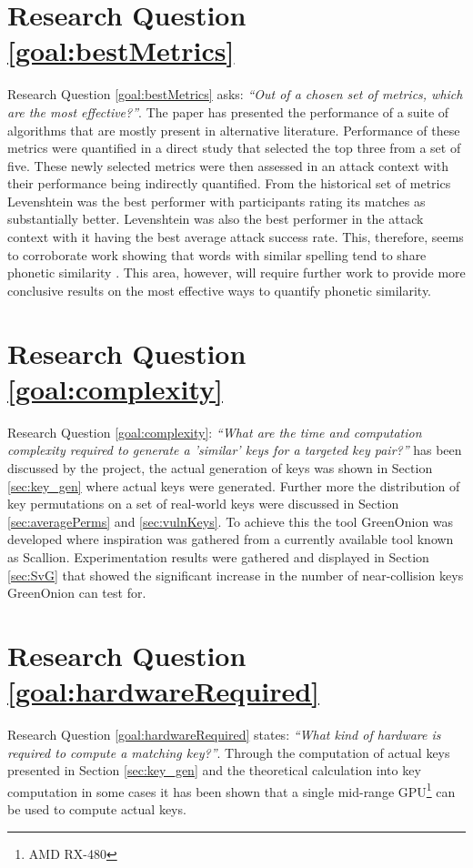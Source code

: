 \section{Research Question \ref{goal:bestMetrics}}
Research Question \ref{goal:bestMetrics} asks: \textit{``Out of a chosen set of metrics, which are the most effective?''}. 
The paper has presented the performance of a suite of algorithms that are mostly present in alternative literature. Performance of these metrics were quantified in a direct study that selected the top three from a set of five. These newly selected metrics were then assessed in an attack context with their performance being indirectly quantified. From the historical set of metrics Levenshtein was the best performer with participants rating its matches as substantially better. Levenshtein was also the best performer in the attack context with it having the best average attack success rate. This, therefore, seems to corroborate work showing that words with similar spelling tend to share phonetic similarity \cite{hettiarachchi2012sparcl}. This area, however, will require further work to provide more conclusive results on the most effective ways to quantify phonetic similarity.

\section{Research Question \ref{goal:complexity}}
Research Question \ref{goal:complexity}: \textit{``What are the time and computation complexity required to generate a ’similar’ keys for a targeted key pair?''} has been discussed by the project, the actual generation of keys was shown in Section \ref{sec:key_gen} where actual keys were generated. Further more the distribution of key permutations on a set of real-world keys were discussed in Section \ref{sec:averagePerms} and \ref{sec:vulnKeys}. To achieve this the tool GreenOnion was developed where inspiration was gathered from a currently available tool known as Scallion. Experimentation results were gathered and displayed in Section \ref{sec:SvG} that showed the significant increase in the number of near-collision keys GreenOnion can test for.


\section{Research Question \ref{goal:hardwareRequired}}
Research Question \ref{goal:hardwareRequired} states: \textit{``What kind of hardware is required to compute a matching key?''}. Through the computation of actual keys presented in Section \ref{sec:key_gen} and the theoretical calculation into key computation in some cases it has been shown that a single mid-range GPU\footnote{AMD RX-480} can be used to compute actual keys.

